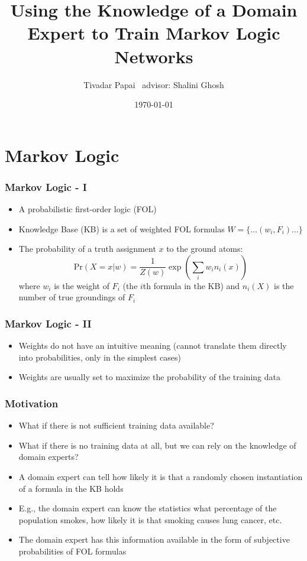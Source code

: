 \documentclass{beamer}
\title{Using the Knowledge of a Domain Expert to 
Train Markov Logic Networks}
\author{Tivadar Papai \ advisor: Shalini Ghosh}
\date{\today}
\newcommand{\Prob}{\mbox{Pr}}
\begin{document}
\frame{\titlepage}

\section[Outline]{}
\frame{\tableofcontents}

\section{Markov Logic}
\frame
{
  \frametitle{Markov Logic - I}

  \begin{itemize}
    \item A probabilistic first-order logic (FOL)
    \item Knowledge Base (KB) is a set of weighted FOL formulas $W = \{\ldots(w_{i},F_{i})\ldots\}$
    \item The probability of a truth assignment $x$ to the ground atoms:
    \[
      \Prob(X=x|w) = \frac{1}{Z(w)} \exp(\sum_i w_i n_i(x))
    \]
    where $w_i$ is the weight of $F_{i}$ (the $i$th formula in the KB) and
    $n_i(X)$ is the number of true groundings of $F_{i}$ 
  \end{itemize}
}

\frame
{
  \frametitle{Markov Logic - II}

  \begin{itemize}
    \item Weights do not have an intuitive meaning (cannot translate them directly into probabilities,
          only in the simplest cases)
    \item Weights are usually set to maximize the probability of the
          training data
  \end{itemize}
}

\frame
{
  \frametitle{Motivation}

  \begin{itemize}
    \item What if there is not sufficient training data available?
    \item What if there is no training data at all, but we can rely on
          the knowledge of domain experts?
    \item A domain expert can tell how likely it is that a randomly chosen instantiation of a formula in the KB
          holds
    \item E.g., the domain expert can know the statistics what percentage of the 
          population smokes, how likely it is that smoking causes lung cancer,
          etc.
    \item The domain expert has this information available in the 
          form of subjective probabilities of FOL formulas
  \end{itemize}
}
\end{document}
